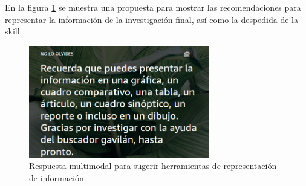 En la figura \ref{fig:57} se muestra una propuesta para mostrar las recomendaciones para representar la información de la investigación final, así como la despedida de la skill.

\begin{figure}
  \centering
  \includegraphics[width=0.70\textwidth]{Cap5/Figuras/Multimodal6.png}
  \caption{Respuesta multimodal para sugerir herramientas de representación de información.}
  \label{fig:57}
\end{figure}
